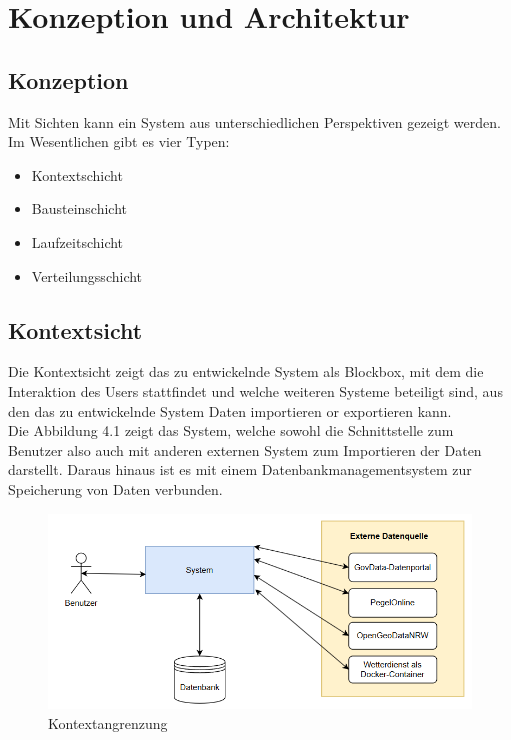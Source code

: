 \documentclass[a4paper,12pt]{scrreprt}
\begin{document}
\chapter{Konzeption und Architektur}
\section{Konzeption}
Mit Sichten kann ein System aus unterschiedlichen Perspektiven gezeigt werden.
Im Wesentlichen gibt es vier Typen:
\begin{itemize}
\item Kontextschicht
\item Bausteinschicht
\item Laufzeitschicht
\item Verteilungsschicht
\end{itemize}

\section*{\large \textbf{Kontextsicht}}
Die Kontextsicht zeigt das zu entwickelnde System als Blockbox, mit dem die Interaktion des Users stattfindet und welche weiteren Systeme beteiligt sind, aus den das zu entwickelnde System Daten importieren or exportieren kann.\\
Die Abbildung 4.1 zeigt das System, welche sowohl die Schnittstelle zum Benutzer  also auch mit anderen externen System zum Importieren der Daten darstellt. Daraus hinaus ist es mit einem Datenbankmanagementsystem zur Speicherung von Daten verbunden.
\begin{figure}[H]
	\centering
	\includegraphics[width=12cm]{Kontextangrenzung.png}
	\caption{\label{} Kontextangrenzung}
\end{figure}
\end{document}
